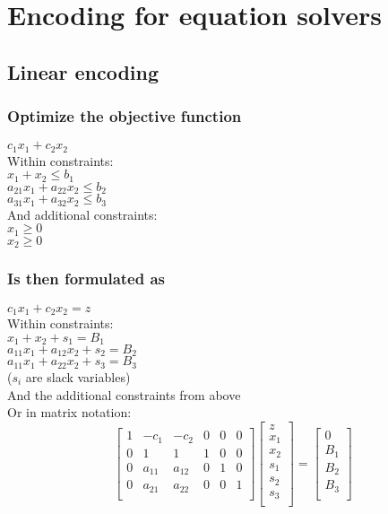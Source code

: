 \section{Encoding for equation solvers}
\subsection{Linear encoding}
\subsubsection{Optimize the objective function}
$c_{1}x_{1}+ c_{2}x_{2}$\\ Within constraints:\\ $x_{1}+ x_{2}\leq b_{1}$\\
$a_{21}x_{1}+ a_{22}x_{2}\leq b_{2}$\\ $a_{31}x_{1}+ a_{32}x_{2}\leq b_{3}$\\
And additional constraints:\\ $x_{1}\geq 0$\\ $x_{2}\geq 0$\\
\subsubsection{Is then formulated as}
$c_{1}x_{1}+ c_{2}x_{2}= z$\\ Within constraints:\\ $x_{1}+ x_{2}+ s_{1}= B_{1}$\\
$a_{11}x_{1}+ a_{12}x_{2}+ s_{2}= B_{2}$\\ $a_{11}x_{1}+ a_{22}x_{2}+ s_{3}= B_{3}$\\
($s_{i}$ are slack variables)\\ And the additional constraints from above\\ Or
in matrix notation:\\
\begin{equation}
	\begin{bmatrix*}
		1 & -c_{1} & -c_{2} & 0 & 0 & 0 \\
		0 & 1      & 1      & 1 & 0 & 0 \\
		0 & a_{11} & a_{12} & 0 & 1 & 0 \\
		0 & a_{21} & a_{22} & 0 & 0 & 1 \\
	\end{bmatrix*}
	\begin{bmatrix*}
		z     \\
		x_{1} \\
		x_{2} \\
		s_{1} \\
		s_{2} \\
		s_{3} \\
	\end{bmatrix*}
	=
	\begin{bmatrix*}
		0     \\
		B_{1} \\
		B_{2} \\
		B_{3} \\
	\end{bmatrix*}
\end{equation}
